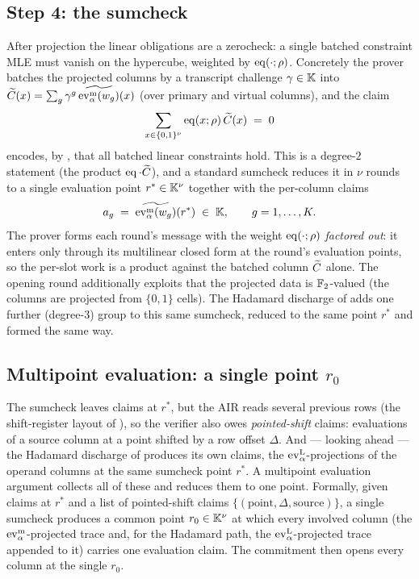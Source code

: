\subsection{Step 4: the sumcheck}
\label{sec:sumcheck}

After projection the linear obligations are a zerocheck: a single batched
constraint MLE must vanish on the hypercube, weighted by $\operatorname{eq}(\cdot;\rho)$.
Concretely the prover batches the projected columns by a transcript
challenge $\gamma\in\mathbb{K}$ into $\widetilde{C}(x)=\sum_g \gamma^{g}\,\widetilde{\operatorname{ev}^{\mathrm{m}}_{\alpha}(w_g)}(x)$
(over primary and virtual columns), and the claim
\[
  \sum_{x\in\{0,1\}^{\nu}} \operatorname{eq}(x;\rho)\,\widetilde{C}(x) \;=\; 0
\]
encodes, by , that all batched linear
constraints hold. This is a degree-$2$ statement (the product
$\operatorname{eq}\cdot\widetilde{C}$), and a standard sumcheck reduces it in $\nu$ rounds to a
single evaluation point $r^*\in\mathbb{K}^{\nu}$ together with the per-column claims
\[
  a_g \;=\; \widetilde{\operatorname{ev}^{\mathrm{m}}_{\alpha}(w_g)}(r^*)\;\in\;\mathbb{K},
  \qquad g = 1,\dots,K.
\]
The prover forms each round's message with the weight $\operatorname{eq}(\cdot;\rho)$
\emph{factored out}: it enters only through its multilinear closed form at the
round's evaluation points, so the per-slot work is a product against the
batched column $\widetilde{C}$ alone. The opening round additionally exploits that
the projected data is $\mathbb{F}_2$-valued (the columns are projected from
$\{0,1\}$ cells). The Hadamard discharge of  adds one
further (degree-$3$) group to this same sumcheck, reduced to the same point
$r^*$ and formed the same way.

\subsection{Multipoint evaluation: a single point $r_0$}
\label{sec:multipoint}

The sumcheck leaves claims at $r^*$, but the AIR reads several previous
rows (the shift-register layout of ), so the verifier also
owes \emph{pointed-shift} claims: evaluations of a source column at a point
shifted by a row offset $\Delta$. And --- looking ahead --- the Hadamard
discharge of  produces its own claims, the
$\operatorname{ev}^{\mathrm{L}}_{\alpha}$-projections of the operand columns at the same sumcheck point $r^*$. A multipoint
evaluation argument collects all of these and reduces them to one point.
Formally, given claims at $r^*$ and a list of pointed-shift claims
$\{(\text{point},\Delta,\text{source})\}$, a single sumcheck produces a
common point $r_0\in\mathbb{K}^{\nu}$ at which every involved column (the
$\operatorname{ev}^{\mathrm{m}}_{\alpha}$-projected trace and, for the Hadamard path, the $\operatorname{ev}^{\mathrm{L}}_{\alpha}$-projected
trace appended to it) carries one evaluation claim. The commitment then
opens every column at the single $r_0$.

